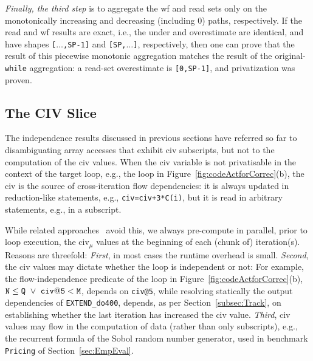\documentclass[10pt,nocopyrightspace]{sigplanconf}
\begin{document}
{\em Finally, the third step} is to aggregate the {\sc wf} and read sets 
only on the monotonically increasing and decreasing (including $0$) paths,
respectively. 
If the read and {\sc wf} results are exact, i.e., the under 
and overestimate are identical, and have shapes {\tt[$\ldots$,SP-1]}  
and {\tt[SP,$\ldots$]}, respectively, then 
one can prove that the result of this piecewise monotonic
aggregation matches the result of the original-{\tt while} aggregation:
a read-set overestimate is {\tt [0,SP-1]}, and privatization was proven.

\subsection{The CIV Slice}
\label{subsect:CivImplem}

The independence results discussed in previous sections have referred 
so far to disambiguating array accesses that exhibit {\sc civ} 
subscripts, but not to the computation of the {\sc civ} values.
%
When the {\sc civ} variable is not privatisable in the context of the 
target loop, e.g., the loop in Figure~\ref{fig:codeActforCorrec}(b), 
the {\sc civ} is the source of cross-iteration flow dependencies: %
it is always updated in reduction-like statements, e.g., {\tt civ=civ+3*C(i)},
but it is read in arbitrary statements, e.g., in a subscript.


While related approaches~\cite{PaduaDemDrInterproc,VEG} avoid this, we always pre-compute in
parallel, prior to loop execution, the {\sc civ}$_\mu$ values at the beginning 
of each (chunk of) iteration(s).
Reasons are threefold: {\em First}, in most cases %
the runtime overhead is small. {\em Second}, the {\sc civ} values may dictate
whether the loop is independent or not: For example,  the flow-independence
predicate of the loop in Figure~\ref{fig:codeActforCorrec}(b), 
${\tt N} \le {\tt Q}~\vee~{\tt civ@5} < {\tt M}$,
depends on {\tt civ@5}, while resolving statically the output 
dependencies of {\tt EXTEND\_do400}, depends, as
per Section~\ref{subsec:Track}, on establishing whether the last
iteration has increased the {\sc civ} value. 
%
{\em Third}, {\sc civ} values may flow in the computation
of data (rather than only subscripts), e.g., the recurrent
formula of the Sobol random number generator, used in
benchmark {\tt Pricing}  of Section~\ref{sec:EmpEval}.
\end{document}
